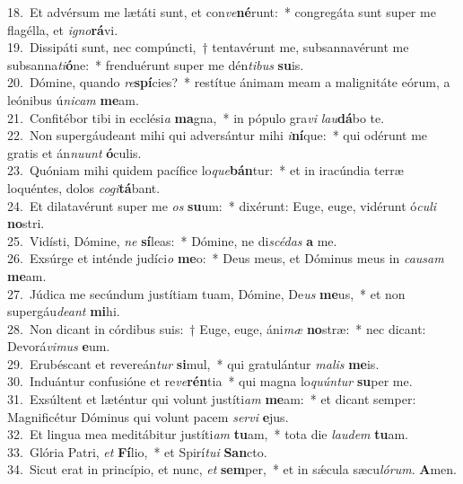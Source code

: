 {18.~}Et advérsum me lætáti sunt, et con\textit{ve}\textbf{né}runt:~* congregáta sunt super me flagélla, et \textit{i}\textit{gno}\textbf{rá}vi.\\
{19.~}Dissipáti sunt, nec compúncti,~† tentavérunt me, subsannavérunt me subsanna\textit{ti}\textbf{ó}ne:~* frenduérunt super me dén\textit{ti}\textit{bus} \textbf{su}is.\\
{20.~}Dómine, quando \textit{re}\textbf{spí}cies?~* restítue ánimam meam a malignitáte eórum, a leónibus ú\textit{ni}\textit{cam} \textbf{me}am.\\
{21.~}Confitébor tibi in ecclési\textit{a} \textbf{ma}gna,~* in pópulo gra\textit{vi} \textit{lau}\textbf{dá}bo te.\\
{22.~}Non supergáudeant mihi qui adversántur mihi \textit{i}\textbf{ní}que:~* qui odérunt me gratis et án\textit{nu}\textit{unt} \textbf{ó}culis.\\
{23.~}Quóniam mihi quidem pacífice lo\textit{que}\textbf{bán}tur:~* et in iracúndia terræ loquéntes, dolos \textit{co}\textit{gi}\textbf{tá}bant.\\
{24.~}Et dilatavérunt super me \textit{os} \textbf{su}um:~* dixérunt: Euge, euge, vidérunt ó\textit{cu}\textit{li} \textbf{no}stri.\\
{25.~}Vidísti, Dómine, \textit{ne} \textbf{sí}leas:~* Dómine, ne di\textit{scé}\textit{das} \textbf{a} me.\\
{26.~}Exsúrge et inténde judíci\textit{o} \textbf{me}o:~* Deus meus, et Dóminus meus in \textit{cau}\textit{sam} \textbf{me}am.\\
{27.~}Júdica me secúndum justítiam tuam, Dómine, De\textit{us} \textbf{me}us,~* et non supergáu\textit{de}\textit{ant} \textbf{mi}hi.\\
{28.~}Non dicant in córdibus suis:~† Euge, euge, áni\textit{mæ} \textbf{no}stræ:~* nec dicant: Devorá\textit{vi}\textit{mus} \textbf{e}um.\\
{29.~}Erubéscant et revereán\textit{tur} \textbf{si}mul,~* qui gratulántur \textit{ma}\textit{lis} \textbf{me}is.\\
{30.~}Induántur confusióne et re\textit{ve}\textbf{rén}tia~* qui magna lo\textit{quún}\textit{tur} \textbf{su}per me.\\
{31.~}Exsúltent et læténtur qui volunt justíti\textit{am} \textbf{me}am:~* et dicant semper: Magnificétur Dóminus qui volunt pacem \textit{ser}\textit{vi} \textbf{e}jus.\\
{32.~}Et lingua mea meditábitur justíti\textit{am} \textbf{tu}am,~* tota die \textit{lau}\textit{dem} \textbf{tu}am.\\
{33.~}Glória Patri, \textit{et} \textbf{Fí}lio,~* et Spirí\textit{tu}\textit{i} \textbf{San}cto.\\
{34.~}Sicut erat in princípio, et nunc, \textit{et} \textbf{sem}per,~* et in sǽcula sæcu\textit{ló}\textit{rum}. \textbf{A}men.\\
